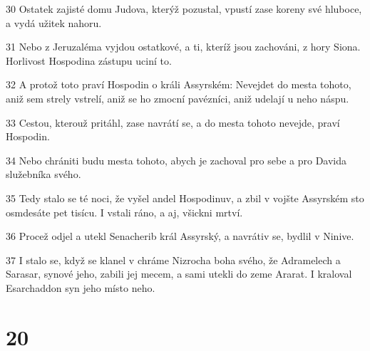 \par 30 Ostatek zajisté domu Judova, kterýž pozustal, vpustí zase koreny své hluboce, a vydá užitek nahoru.
\par 31 Nebo z Jeruzaléma vyjdou ostatkové, a ti, kteríž jsou zachováni, z hory Siona. Horlivost Hospodina zástupu uciní to.
\par 32 A protož toto praví Hospodin o králi Assyrském: Nevejdet do mesta tohoto, aniž sem strely vstrelí, aniž se ho zmocní pavézníci, aniž udelají u neho náspu.
\par 33 Cestou, kterouž pritáhl, zase navrátí se, a do mesta tohoto nevejde, praví Hospodin.
\par 34 Nebo chrániti budu mesta tohoto, abych je zachoval pro sebe a pro Davida služebníka svého.
\par 35 Tedy stalo se té noci, že vyšel andel Hospodinuv, a zbil v vojšte Assyrském sto osmdesáte pet tisícu. I vstali ráno, a aj, všickni mrtví.
\par 36 Procež odjel a utekl Senacherib král Assyrský, a navrátiv se, bydlil v Ninive.
\par 37 I stalo se, když se klanel v chráme Nizrocha boha svého, že Adramelech a Sarasar, synové jeho, zabili jej mecem, a sami utekli do zeme Ararat. I kraloval Esarchaddon syn jeho místo neho.

\chapter{20}

